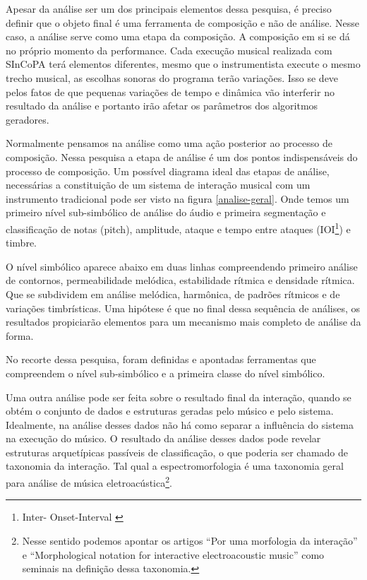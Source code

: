 \documentclass[draft]{ppgmus}
\begin{document}
Apesar da análise ser um dos principais elementos dessa pesquisa, é preciso
definir que o objeto final é uma ferramenta de composição e não de análise.
Nesse caso, a análise serve como uma etapa da composição. A composição em si
se dá no próprio momento da performance. Cada execução musical realizada
com SInCoPA terá elementos diferentes, mesmo que o instrumentista execute
o mesmo trecho musical, as escolhas sonoras do programa terão variações.
Isso se deve pelos fatos de que pequenas variações de tempo e dinâmica 
vão interferir no resultado da análise e portanto irão afetar os parâmetros
dos algoritmos geradores.

Normalmente pensamos na análise
como uma ação posterior ao processo de composição. Nessa pesquisa a etapa
de análise é um dos pontos indispensáveis do processo de composição.
Um possível diagrama ideal das etapas de análise, necessárias a
constituição de um sistema de interação musical com um instrumento
tradicional pode ser visto na figura \ref{analise-geral}. Onde temos um
primeiro nível sub-simbólico de análise do áudio e primeira segmentação
e classificação de notas (pitch), amplitude, ataque e tempo entre ataques (IOI\footnote{Inter-
Onset-Interval \cite{rowe2004machine}}) e timbre.

O nível simbólico aparece abaixo em duas linhas compreendendo primeiro análise de 
contornos, permeabilidade melódica, estabilidade rítmica e densidade rítmica. 
Que se subdividem em análise melódica, harmônica, de padrões rítmicos e de 
variações timbrísticas. Uma hipótese é que no final dessa sequência de análises,
os resultados propiciarão elementos para um mecanismo mais completo de análise da
forma.



No recorte dessa pesquisa, foram definidas e apontadas ferramentas que compreendem o nível
sub-simbólico e a primeira classe do nível simbólico. 


Uma outra análise pode ser feita sobre o resultado final da interação, quando se obtém
o conjunto de dados e estruturas geradas pelo músico e pelo sistema. Idealmente, na análise desses 
dados não há como separar
a influência do sistema na execução do músico. O resultado da análise desses dados pode revelar
estruturas arquetípicas passíveis de classificação, o que poderia ser chamado de taxonomia 
da interação. Tal qual a espectromorfologia \cite{smalley:86} é uma taxonomia geral
para análise de música eletroacústica\footnote{Nesse sentido podemos apontar os artigos
``Por uma morfologia da interação'' \cite{menezes2006musica} e ``Morphological notation for interactive electroacoustic music'' 
\cite{Patton:2007} como seminais na definição dessa taxonomia.}.
\end{document}
